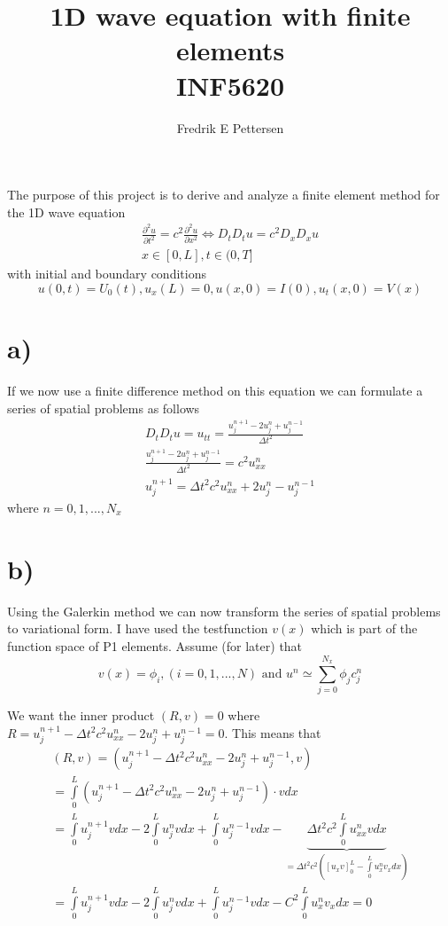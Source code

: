 \documentclass[a4paper,english, 10pt, twoside]{article}
\title{1D wave equation with finite elements\\ INF5620}
\author{Fredrik E Pettersen}
\begin{document}
\maketitle
The purpose of this project is to derive and analyze a finite element method for the 1D wave equation
\begin{align*}
 \frac{\partial^2 u}{\partial t^2} = c^2\frac{\partial^2 u}{\partial x^2} \Leftrightarrow D_tD_tu = c^2D_xD_xu\\
 x\in[0,L], t\in(0,T]
\end{align*}
with initial and boundary conditions
$$
u(0,t) = U_0(t), u_x(L) = 0, u(x,0) = I(0), u_t(x,0) = V(x)
$$

\section*{a)}
If we now use a finite difference method on this equation we can formulate a series of spatial problems as follows
\begin{align*}
 D_tD_tu = u_{tt} = \frac{u_j^{n+1} - 2u_j^n+u_j^{n-1}}{\Delta t^2} \\
 \frac{u_j^{n+1} - 2u_j^n+u_j^{n-1}}{\Delta t^2} = c^2u_{xx}^n \\
 u_j^{n+1} = \Delta t^2c^2u_{xx}^n + 2u_j^n - u_j^{n-1}
\end{align*}
where $n = 0,1,...,N_x$
\section*{b)}
Using the Galerkin method we can now transform the series of spatial problems to variational form. I have used the testfunction $v(x)$ which is 
part of the function space of P1 elements. Assume (for later) that
\begin{equation}\label{approx}
v(x) = \phi_i, (i=0,1,...,N) \text{  and  } u^n \simeq \sum\limits_{j=0}^{N_x} \phi_jc^n_j
\end{equation}

We want the inner product $\left(R,v\right) = 0 $ where $R =  u_j^{n+1} - \Delta t^2c^2u_{xx}^n - 2u_j^n + u_j^{n-1} = 0$. This means that
\begin{align*}
 \left(R,v\right)=  \left(u_j^{n+1} - \Delta t^2c^2u_{xx}^n - 2u_j^n + u_j^{n-1},v\right) \\
 = \int\limits_0^L \left(u_j^{n+1} - \Delta t^2c^2u_{xx}^n - 2u_j^n + u_j^{n-1}\right)\cdot v dx \\
 = \int\limits_0^Lu_j^{n+1}vdx -2\int\limits_0^Lu_j^nvdx + \int\limits_0^Lu_j^{n-1}vdx - \underbrace{\Delta t^2c^2\int\limits_0^Lu_{xx}^nvdx}_{
 = \Delta t^2c^2\left([u_xv]_0^L-\int\limits_0^Lu_x^nv_xdx\right)}\\
 = \int\limits_0^Lu_j^{n+1}vdx -2\int\limits_0^Lu_j^nvdx + \int\limits_0^Lu_j^{n-1}vdx - C^2\int\limits_0^Lu_x^nv_xdx = 0
\end{align*}
\end{document}
